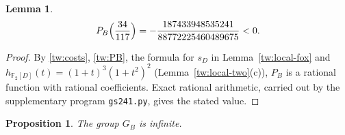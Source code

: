 \documentclass[11pt]{amsart}
\numberwithin{equation}{section}
\newtheorem{proposition}[equation]{Proposition}
\newtheorem{lemma}[equation]{Lemma}
\theoremstyle{definition}
\theoremstyle{remark}
\newcommand{\Ftwo}{\mathbb F_2}
\begin{document}
\begin{lemma}\label{tw:PB-value}
\[
 P_B\Bigl(\frac{34}{117}\Bigr)=-\frac{187433948535241}{88772225460489675}<0.
\]
\end{lemma}

\begin{proof}
By \eqref{tw:costs}, \eqref{tw:PB}, the formula for $s_D$ in
Lemma~\ref{tw:local-fox} and $h_{\Ftwo[D]}(t)=(1+t)^3(1+t^2)^2$
(Lemma~\ref{tw:local-two}(c)), $P_B$ is a rational function with rational
coefficients. Exact rational arithmetic, carried out by the supplementary
program \texttt{gs241.py}, gives the stated value.
\end{proof}

\begin{proposition}\label{tw:infinite}
The group $G_B$ is infinite.
\end{proposition}
\end{document}
